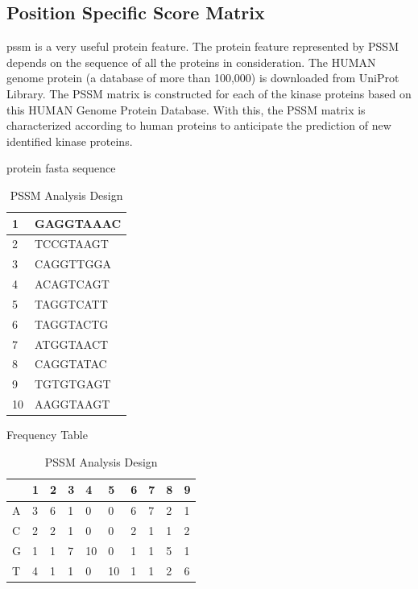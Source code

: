 \subsection{Position Specific Score Matrix}

\acrfull{pssm} is a very useful protein feature. The protein feature represented by PSSM depends on the sequence of all the proteins in consideration. The HUMAN genome protein (a database of more than 100,000) is downloaded from UniProt Library. The PSSM matrix is constructed for each of the kinase proteins based on this HUMAN Genome Protein Database. With this, the PSSM matrix is characterized according to human proteins to anticipate the prediction of new identified kinase proteins.

\begin{table}
  \centering
  \caption{PSSM Analysis Design} 
  \begin{subtable}[]{protein fasta sequence}
    \begin{tabular}{|l|l|}
    \hline
    
    1 & GAGGTAAAC \\ \hline
    2 & TCCGTAAGT \\ \hline
    3 & CAGGTTGGA \\ \hline
    4 & ACAGTCAGT \\ \hline
    5 & TAGGTCATT \\ \hline
    6 & TAGGTACTG \\ \hline
    7 & ATGGTAACT \\ \hline
    8 & CAGGTATAC \\ \hline
    9 & TGTGTGAGT \\ \hline
    10 & AAGGTAAGT \\ \hline
    
    \end{tabular}
    
  \end{subtable}

  \begin{subtable}[]{Frequency Table}
    \begin{tabular}{|l|l|l|l|l|l|l|l|l|l|}
    \hline
    
     & 1 & 2 & 3 & 4 & 5 & 6 & 7 & 8 & 9 \\ \hline
    A & 3 & 6 & 1 & 0 & 0 & 6 & 7 & 2 & 1 \\ \hline
    C & 2 & 2 & 1 & 0 & 0 & 2 & 1 & 1 & 2 \\ \hline
    G & 1 & 1 & 7 & 10 & 0 & 1 & 1 & 5 & 1 \\ \hline
    T & 4 & 1 & 1 & 0 & 10 & 1 & 1 & 2 & 6 \\ \hline
    

\end{tabular}
\end{subtable}
\end{table}
